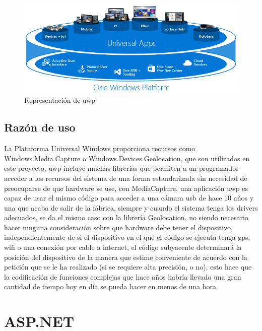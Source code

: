 \begin{figure}[!htbp]
	\centering
	\includegraphics[scale=0.7]{fig/uwp_representation}
	\caption{Representación de \acrshort{uwp}}
\end{figure}

\FloatBarrier

\subsection{Razón de uso}

La Plataforma Universal Windows proporciona recursos como Windows.Media.Capture o Windows.Devices.Geolocation, que son utilizados en este proyecto, \acrshort{uwp} incluye muchas librerías que permiten a un programador acceder a los recursos del sistema de una forma estandarizada sin necesidad de preocuparse de que hardware se use, con MediaCapture, una aplicación \acrshort{uwp} es capaz de usar el mismo código para acceder a una cámara \acrshort{usb} de hace 10 años y una que acaba de salir de la fábrica, siempre y cuando el sistema tenga los drivers adecuados, se da el mismo caso con la librería Geolocation, no siendo necesario hacer ninguna consideración sobre que hardware debe tener el dispositivo, independientemente de si el dispositivo en el que el código se ejecuta tenga \acrshort{gps}, \acrshort{wifi} o una conexión por cable a internet, el código subyacente determinará la posición del dispositivo de la manera que estime conveniente de acuerdo con la petición que se le ha realizado (si se requiere alta precisión, o no), esto hace que la codificación de funciones complejas que hace años habría llevado una gran cantidad de tiempo hoy en día se pueda hacer en menos de una hora.




\section{ASP.NET}

